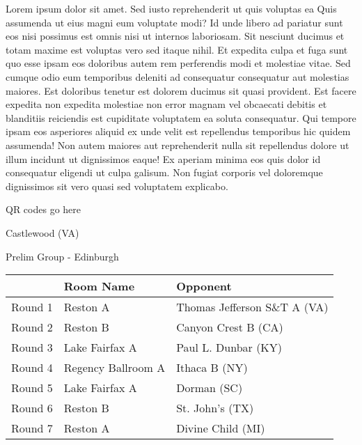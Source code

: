 \documentclass{article}%
\begin{document}
\vspace*{8pt}%
\linebreak%
\newline%
\newline%
Lorem ipsum dolor sit amet. Sed iusto reprehenderit ut quis voluptas ea Quis assumenda ut eius magni eum voluptate modi? Id unde libero ad pariatur sunt eos nisi possimus est omnis nisi ut internos laboriosam. Sit nesciunt ducimus et totam maxime est voluptas vero sed itaque nihil. Et expedita culpa et fuga sunt quo esse ipsam eos doloribus autem rem perferendis modi et molestiae vitae.\newline%
\newline%
Sed cumque odio eum temporibus deleniti ad consequatur consequatur aut molestias maiores. Est doloribus tenetur est dolorem ducimus sit quasi provident. Est facere expedita non expedita molestiae non error magnam vel obcaecati debitis et blanditiis reiciendis est cupiditate voluptatem ea soluta consequatur. Qui tempore ipsam eos asperiores aliquid ex unde velit est repellendus temporibus hic quidem assumenda!\newline%
\newline%
Non autem maiores aut reprehenderit nulla sit repellendus dolore ut illum incidunt ut dignissimos eaque! Ex aperiam minima eos quis dolor id consequatur eligendi ut culpa galisum. Non fugiat corporis vel doloremque dignissimos sit vero quasi sed voluptatem explicabo.\newline%
\newline%
%
\vspace*{30pt}%
\begin{center}%
\begin{Huge}%
QR codes go here%
\end{Huge}%
\end{center}%
\newpage%
%
\begin{center}%
\begin{Huge}%
Castlewood (VA)%
\end{Huge}%
\vspace*{8pt}%
\linebreak%
\begin{Large}%
Prelim Group {-} Edinburgh%
\end{Large}%
\end{center}%
\begin{tabularx}{\textwidth}{|c|Y|Y|}%
\hline%
&Room Name&Opponent\\%
\hline%
Round 1&Reston A&Thomas Jefferson S\&T A (VA)\\%
Round 2&Reston B&Canyon Crest B (CA)\\%
Round 3&Lake Fairfax A&Paul L. Dunbar (KY)\\%
Round 4&Regency Ballroom A&Ithaca B (NY)\\%
Round 5&Lake Fairfax A&Dorman (SC)\\%
Round 6&Reston B&St. John's (TX)\\%
Round 7&Reston A&Divine Child (MI)\\%
\hline%
\end{tabularx}%
\end{document}
